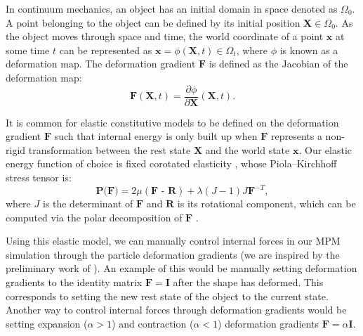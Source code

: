     In continuum mechanics, an object has an initial domain in space
    denoted as $\Omega_0$. A point belonging to the object can be defined by its initial position $\textbf{X} \in \Omega_0$. As the object moves through space and time, the world coordinate of a point $\textbf{x}$ at some time $t$ can be represented as $\textbf{x} = \phi(\textbf{X}, t) \in \Omega_t$, where $\phi$ is known as a deformation map. The deformation gradient $\textbf{F}$ is defined as the Jacobian of the deformation map:
    \begin{equation}
        \mathbf{F}(\mathbf{X}, t) = \frac{\partial \phi}{\partial \mathbf{X}}(\mathbf{X}, t).
    \end{equation}
    
    It is common for elastic constitutive models to be defined on
    the deformation gradient $\textbf{F}$ such that internal energy is only built
    up when $\textbf{F}$ represents a non-rigid transformation between the rest
    state $\textbf{X}$ and the world state $\textbf{x}$. Our elastic energy function of choice is fixed corotated elasticity \citep{stomakhin2012energetically, jiang2016material}, whose Piola--Kirchhoff stress tensor is:
    \begin{equation}
        \textbf{P(F)} = 2\mu(\textbf{F - R}) + \lambda(J-1)J\textbf{F}^{-T},
    \end{equation}
    where $J$ is the determinant of $\mathbf{F}$ and $\mathbf{R}$ is its rotational component, which can be computed via the polar decomposition of $\mathbf{F}$ \citep{gast2016implicit}.
    
    Using this elastic model, we can manually control internal forces in our {MPM} simulation through the particle deformation gradients (we are inspired by the preliminary work of \citet{10.1145/3606037.3606840}).
    An example of this would be manually setting deformation gradients to the identity matrix $\mathbf{F} = \mathbf{I}$ after the shape has deformed. 
    This corresponds to setting the new rest state of the object to the current state. 
    Another way to control internal forces through deformation gradients would be setting expansion ($\alpha > 1$) and contraction ($\alpha < 1$) deformation gradients $\mathbf{F} = \alpha \mathbf{I}$.
    
